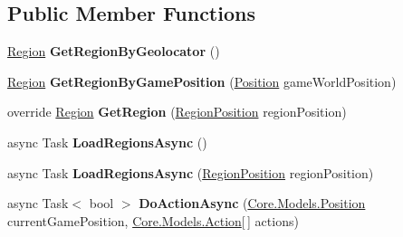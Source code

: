 \subsection*{Public Member Functions}
\begin{DoxyCompactItemize}
\item 
\hypertarget{classClient_1_1Common_1_1Manager_1_1RegionManagerController_aec46cc3e22d4ebc001c4e19fc0c0cf48}{\hyperlink{classCore_1_1Models_1_1Region}{Region} {\bfseries Get\-Region\-By\-Geolocator} ()}\label{classClient_1_1Common_1_1Manager_1_1RegionManagerController_aec46cc3e22d4ebc001c4e19fc0c0cf48}

\item 
\hypertarget{classClient_1_1Common_1_1Manager_1_1RegionManagerController_a449853590dde1fc7fc56388afafd6bf3}{\hyperlink{classCore_1_1Models_1_1Region}{Region} {\bfseries Get\-Region\-By\-Game\-Position} (\hyperlink{classCore_1_1Models_1_1Position}{Position} game\-World\-Position)}\label{classClient_1_1Common_1_1Manager_1_1RegionManagerController_a449853590dde1fc7fc56388afafd6bf3}

\item 
\hypertarget{classClient_1_1Common_1_1Manager_1_1RegionManagerController_a63a3b272d688663f463c29d212cdf2e9}{override \hyperlink{classCore_1_1Models_1_1Region}{Region} {\bfseries Get\-Region} (\hyperlink{classCore_1_1Models_1_1RegionPosition}{Region\-Position} region\-Position)}\label{classClient_1_1Common_1_1Manager_1_1RegionManagerController_a63a3b272d688663f463c29d212cdf2e9}

\item 
\hypertarget{classClient_1_1Common_1_1Manager_1_1RegionManagerController_a4f96c6b873b549b5e3689f2ed6eb67cb}{async Task {\bfseries Load\-Regions\-Async} ()}\label{classClient_1_1Common_1_1Manager_1_1RegionManagerController_a4f96c6b873b549b5e3689f2ed6eb67cb}

\item 
\hypertarget{classClient_1_1Common_1_1Manager_1_1RegionManagerController_acd0e178aef1c3c5efccc6e19dd3b73b4}{async Task {\bfseries Load\-Regions\-Async} (\hyperlink{classCore_1_1Models_1_1RegionPosition}{Region\-Position} region\-Position)}\label{classClient_1_1Common_1_1Manager_1_1RegionManagerController_acd0e178aef1c3c5efccc6e19dd3b73b4}

\item 
\hypertarget{classClient_1_1Common_1_1Manager_1_1RegionManagerController_a4e248f5877d9aa7b944cff4084ffdc67}{async Task$<$ bool $>$ {\bfseries Do\-Action\-Async} (\hyperlink{classCore_1_1Models_1_1Position}{Core.\-Models.\-Position} current\-Game\-Position, \hyperlink{classCore_1_1Models_1_1Action}{Core.\-Models.\-Action}\mbox{[}$\,$\mbox{]} actions)}\label{classClient_1_1Common_1_1Manager_1_1RegionManagerController_a4e248f5877d9aa7b944cff4084ffdc67}


\end{DoxyCompactItemize}
